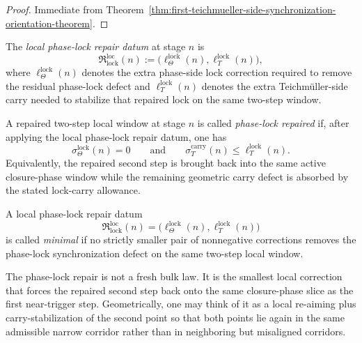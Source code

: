 \begin{proof}
Immediate from Theorem~\ref{thm:first-teichmueller-side-synchronization-orientation-theorem}.
\end{proof}



\begin{definition}
\label{def:local-phase-lock-repair-datum}
The \emph{local phase-lock repair datum} at stage $n$ is
\[
 \mathfrak R_{\mathrm{lock}}^{\mathrm{loc}}(n)
 :=
 \bigl(
 \ell_{\Theta}^{\mathrm{lock}}(n),
 \ell_{T}^{\mathrm{lock}}(n)
 \bigr),
\]
where $\ell_{\Theta}^{\mathrm{lock}}(n)$ denotes the extra phase-side lock correction required to remove the residual phase-lock defect and $\ell_{T}^{\mathrm{lock}}(n)$ denotes the extra Teichm\"uller-side carry needed to stabilize that repaired lock on the same two-step window.
\end{definition}

\begin{definition}
\label{def:phase-lock-repaired-local-window}
A repaired two-step local window at stage $n$ is called \emph{phase-lock repaired} if, after applying the local phase-lock repair datum, one has
\[
 \sigma_{\Theta}^{\mathrm{lock}}(n)=0
 \qquad\text{and}\qquad
 \sigma_T^{\mathrm{carry}}(n)\le \ell_T^{\mathrm{lock}}(n).
\]
Equivalently, the repaired second step is brought back into the same active closure-phase window while the remaining geometric carry defect is absorbed by the stated lock-carry allowance.
\end{definition}

\begin{definition}
\label{def:minimal-local-phase-lock-repair}
A local phase-lock repair datum
\[
 \mathfrak R_{\mathrm{lock}}^{\mathrm{loc}}(n)
 =
 \bigl(
 \ell_{\Theta}^{\mathrm{lock}}(n),
 \ell_{T}^{\mathrm{lock}}(n)
 \bigr)
\]
is called \emph{minimal} if no strictly smaller pair of nonnegative corrections removes the phase-lock synchronization defect on the same two-step local window.
\end{definition}

\begin{remark}
\label{rem:what-the-phase-lock-repair-really-does}
The phase-lock repair is not a fresh bulk law. It is the smallest local correction that forces the repaired second step back onto the same closure-phase slice as the first near-trigger step. Geometrically, one may think of it as a local re-aiming plus carry-stabilization of the second point so that both points lie again in the same admissible narrow corridor rather than in neighboring but misaligned corridors.
\end{remark}

